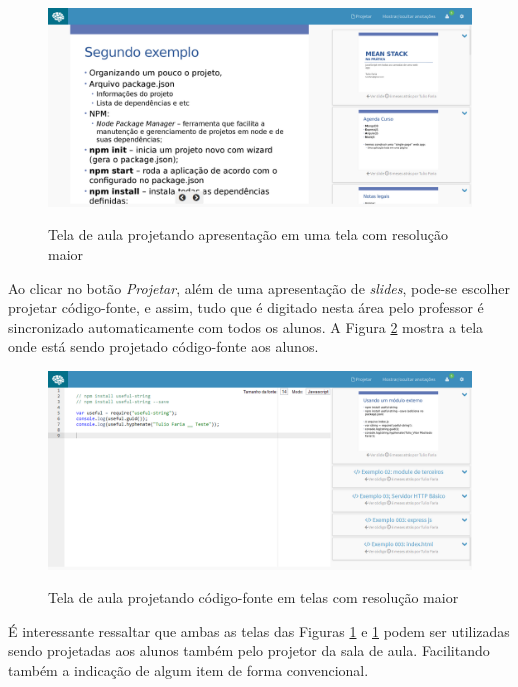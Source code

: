 \begin{figure}[h]
\centering
\caption{Tela de aula projetando apresentação em uma tela com resolução maior}
\includegraphics[width=1.0\textwidth]{imgs/tela_aula_pc.png} 
\label{fig:tela_aula_pc} 
\end{figure}

Ao clicar no botão \emph{Projetar}, além de uma apresentação de \emph{slides}, pode-se escolher projetar código-fonte, e assim, tudo que é digitado nesta área pelo professor é sincronizado automaticamente com todos os alunos. A Figura \ref{fig:tela_aula_pc_codigo} mostra a tela onde está sendo projetado código-fonte aos alunos.

\begin{figure}[h]
\centering
\caption{Tela de aula projetando código-fonte em telas com resolução maior}
\includegraphics[width=1.0\textwidth]{imgs/tela_aula_pc_codigo.png} 
\label{fig:tela_aula_pc_codigo} 
\end{figure}

É interessante ressaltar que ambas as telas das Figuras \ref{fig:tela_aula_pc} e \ref{fig:tela_aula_pc} podem ser utilizadas sendo projetadas aos alunos também pelo projetor da sala de aula. Facilitando também a indicação de algum item de forma convencional.


